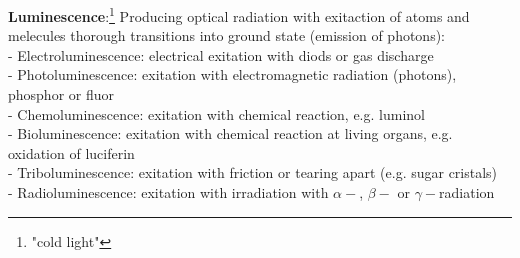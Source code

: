 \textbf{Luminescence}:\footnote{"cold light"}  
\vspace{2ex} \newline 
Producing optical radiation with exitaction of atoms and melecules thorough transitions into ground state (emission of photons): \\
- Electroluminescence: electrical exitation with diods or gas discharge \\
- Photoluminescence: exitation with electromagnetic radiation (photons), phosphor or fluor \\
- Chemoluminescence: exitation with chemical reaction, e.g. luminol \\
- Bioluminescence: exitation with chemical reaction at living organs, e.g. oxidation of luciferin \\
- Triboluminescence: exitation with friction or tearing apart (e.g. sugar cristals) \\
- Radioluminescence: exitation with irradiation with $\alpha-$, $\beta-$ or $\gamma-$radiation
\vspace{2ex} \newline 
